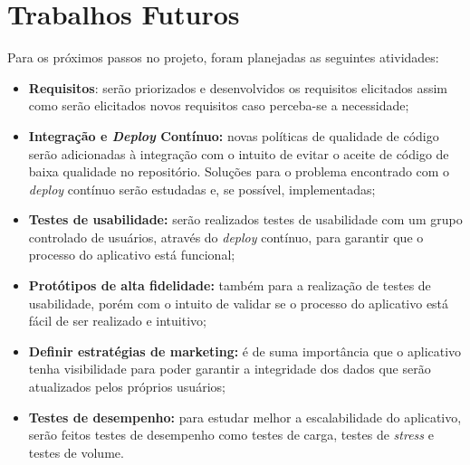 \section{Trabalhos Futuros}

Para os próximos passos no projeto, foram planejadas as seguintes atividades:

\begin{itemize}
    \item \textbf{Requisitos}: serão priorizados e desenvolvidos os requisitos elicitados assim como serão elicitados novos requisitos caso perceba-se a necessidade;
    \item \textbf{Integração e \textit{Deploy} Contínuo:} novas políticas de qualidade de código serão adicionadas à integração com o intuito de evitar o aceite de código de baixa qualidade no repositório. Soluções para o problema encontrado com o \textit{deploy} contínuo serão estudadas e, se possível, implementadas;
    \item \textbf{Testes de usabilidade:} serão realizados testes de usabilidade com um grupo controlado de usuários, através do \textit{deploy} contínuo, para garantir que o processo do aplicativo está funcional;
    \item \textbf{Protótipos de alta fidelidade:} também para a realização de testes de usabilidade, porém com o intuito de validar se o processo do aplicativo está fácil de ser realizado e intuitivo;
    \item \textbf{Definir estratégias de marketing:} é de suma importância que o aplicativo tenha visibilidade para poder garantir a integridade dos dados que serão atualizados pelos próprios usuários;
    \item \textbf{Testes de desempenho:} para estudar melhor a escalabilidade do aplicativo, serão feitos testes de desempenho como testes de carga, testes de \textit{stress} e testes de volume.
\end{itemize}
